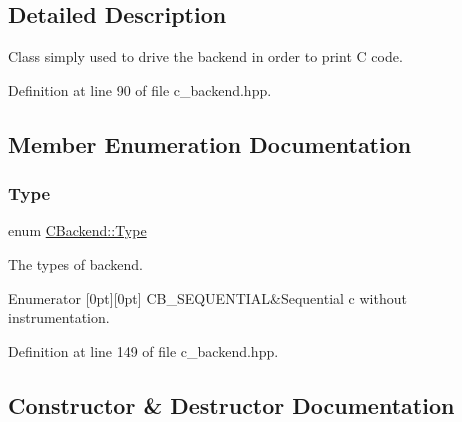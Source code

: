 \subsection{Detailed Description}
Class simply used to drive the backend in order to print C code. 

Definition at line 90 of file c\+\_\+backend.\+hpp.



\subsection{Member Enumeration Documentation}
\mbox{\label{classCBackend_abadfd9ef309ba4d12e648fe2e3fff08b}} 
\subsubsection{\texorpdfstring{Type}{Type}}
{\footnotesize\ttfamily enum \hyperlink{classCBackend_abadfd9ef309ba4d12e648fe2e3fff08b}{C\+Backend\+::\+Type}}



The types of backend. 

\begin{DoxyEnumFields}{Enumerator}
[0pt][0pt]{}\mbox{\label{classCBackend_abadfd9ef309ba4d12e648fe2e3fff08bac7f88561cc85e7035d39ec9ccd25c413}} 
C\+B\+\_\+\+S\+E\+Q\+U\+E\+N\+T\+I\+AL&Sequential c without instrumentation. \\
\hline

\end{DoxyEnumFields}


Definition at line 149 of file c\+\_\+backend.\+hpp.



\subsection{Constructor \& Destructor Documentation}
\mbox{\label{classCBackend_a1e313cf2e64972680a630fffda96ef7e}} 
